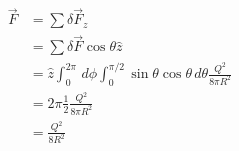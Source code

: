 \documentclass[solutions]{esg8022pset}
\begin{document}
  \begin{align*}
    \vec F & = \sum \delta \vec F_z \\
           & = \sum \delta \vec F \cos\theta\hat z \\
           & = \hat z \int_0^{2\pi}\,d\phi\int_0^{\pi / 2}\sin\theta\cos\theta\,d\theta \frac{Q^2}{8\pi R^2} \\
           & = 2\pi \frac12 \frac{Q^2}{8\pi R^2} \\
           & = \frac{Q^2}{8 R^2}
  \end{align*}



%
%
\end{document}
